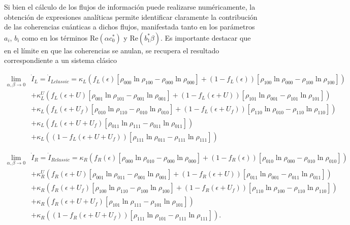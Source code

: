 \begin{appendixs}
Si bien el cálculo de los flujos de información puede realizarse numéricamente, la obtención de expresiones analíticas permite identificar claramente la contribución de las coherencias cuánticas a dichos flujos, manifestada tanto en los parámetros $a_i$, $b_i$ como en los términos $\mathrm{Re}(\alpha c_0^*)$ y $\mathrm{Re}(b_1^* \beta)$. 
Es importante destacar que en el límite en que las coherencias se anulan, se recupera el resultado correspondiente a un sistema clásico

\begin{align*}
 \lim_{\alpha,\beta \to 0}  & \dot{I}_{L}  = \dot{I}_{Lclassic}   =  \kappa_{L}(f_{L}(\epsilon)[\rho_{000}\ln \rho_{100} - \rho_{000}\ln \rho_{000}] + (1-f_{L}(\epsilon))[\rho_{100}\ln \rho_{000} - \rho_{100}\ln \rho_{100} ] )  \\ 
      & + \kappa^{U}_{L}(f_{L}(\epsilon + U)[\rho_{001}\ln \rho_{101} - \rho_{001}\ln \rho_{001}] + (1-f_{L}(\epsilon + U))[\rho_{101}\ln \rho_{001} -\rho_{101}\ln \rho_{101} ]   ) \\  
      & + \kappa_{L}( f_{L}(\epsilon + U_{f})[\rho_{010}\ln \rho_{110} -\rho_{010}\ln \rho_{010} ]  + (1-f_{L}(\epsilon + U_{f}))[\rho_{110}\ln \rho_{010} - \rho_{110}\ln \rho_{110} ] ) \\  
      & + \kappa_{L}( f_{L}(\epsilon + U + U_{f})[\rho_{011}\ln \rho_{111}- \rho_{011}\ln \rho_{011}]) \\   
      & + \kappa_{L}( (1-f_{L}(\epsilon+U+U_{f}) )[\rho_{111}\ln \rho_{011} - \rho_{111}\ln \rho_{111}])   
\end{align*}

\begin{align*}
 \lim_{\alpha,\beta \to 0}  & \dot{I}_{R}  = \dot{I}_{Rclassic}   =  \kappa_{R}(f_{R}(\epsilon)[\rho_{000}\ln \rho_{010} - \rho_{000}\ln \rho_{000}] + (1-f_{R}(\epsilon))[\rho_{010}\ln \rho_{000} - \rho_{010}\ln \rho_{010} ] )  \\ 
      & + \kappa^{U}_{R}(f_{R}(\epsilon + U)[\rho_{001}\ln \rho_{011} - \rho_{001}\ln \rho_{001}] + (1-f_{R}(\epsilon + U))[\rho_{011}\ln \rho_{001} -\rho_{011}\ln \rho_{011} ]   ) \\  
      & + \kappa_{R}( f_{R}(\epsilon + U_{f})[\rho_{100}\ln \rho_{110} -\rho_{100}\ln \rho_{100} ]  + (1-f_{R}(\epsilon + U_{f}))[\rho_{110}\ln \rho_{100} - \rho_{110}\ln \rho_{110} ] ) \\  
      & + \kappa_{R}( f_{R}(\epsilon + U + U_{f})[\rho_{101}\ln \rho_{111}- \rho_{101}\ln \rho_{101}]) \\   
      & + \kappa_{R}( (1-f_{R}(\epsilon+U+U_{f}) )[\rho_{111}\ln \rho_{101} - \rho_{111}\ln \rho_{111}]).   
\end{align*}

\label{apendix5infoflow}

\end{appendixs}